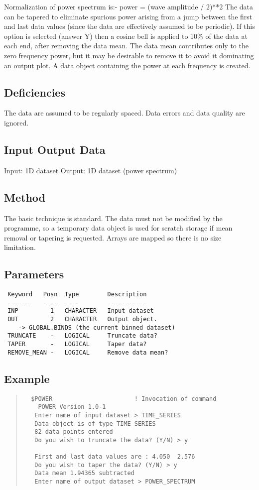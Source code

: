 \documentclass{book}
\renewcommand{\_}{{\tt\char'137}}     %
\begin{document}
Normalization of power spectrum is:-
power = (wave amplitude / 2)**2
The data can be tapered to eliminate spurious power arising from
a jump between the first and last data values (since the data
are effectively assumed to be periodic). If this option is
selected (answer Y) then a cosine bell is applied to 10\% of the
data at each end, after removing the data mean.
The data mean contributes only to the zero frequency power, but
it may be desirable to remove it to avoid it dominating an output
plot.
A data object containing the power at each frequency is created.
\subsection{Deficiencies}
The data are assumed to be regularly spaced. Data errors and data
quality are ignored.
\subsection{Input Output Data}
Input: 1D dataset
Output: 1D dataset (power spectrum)
\subsection{Method}
The basic technique is standard. The data must not be modified by
the programme, so a temporary data object is used for scratch
storage if mean removal or tapering is requested. Arrays are
mapped so there is no size limitation.

\subsection{Parameters}
\begin{verbatim}
 Keyword   Posn  Type        Description
 -------   ----  ----        -----------
 INP         1   CHARACTER   Input dataset
 OUT         2   CHARACTER   Output object.
    -> GLOBAL.BINDS (the current binned dataset)
 TRUNCATE    -   LOGICAL     Truncate data?
 TAPER       -   LOGICAL     Taper data?
 REMOVE_MEAN -   LOGICAL     Remove data mean?

\end{verbatim}\subsection{Example}
\begin{quote}\begin{verbatim}
  $POWER                       ! Invocation of command
    POWER Version 1.0-1
   Enter name of input dataset > TIME_SERIES
   Data object is of type TIME_SERIES
   82 data points entered
   Do you wish to truncate the data? (Y/N) > y

   First and last data values are : 4.050  2.576
   Do you wish to taper the data? (Y/N) > y
   Data mean 1.94365 subtracted
   Enter name of output dataset > POWER_SPECTRUM
\end{verbatim}\end{quote}
\end{document}

